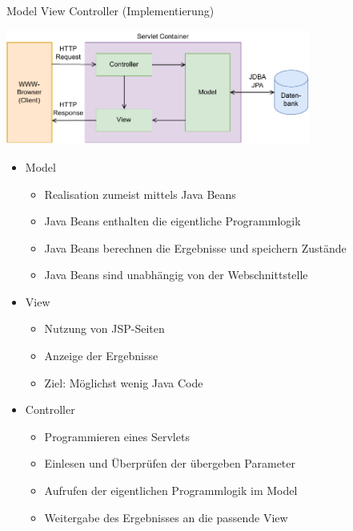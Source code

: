 \begin{defi}{Model View Controller (Implementierung)}
    \begin{center}
        \includegraphics[width=0.75\textwidth]{includes/figures/defi_model_view_controller.pdf}
    \end{center}

    \begin{itemize}
        \item Model
              \begin{itemize}
                  \item Realisation zumeist mittels Java Beans
                  \item Java Beans enthalten die eigentliche Programmlogik
                  \item Java Beans berechnen die Ergebnisse und speichern Zustände
                  \item Java Beans sind unabhängig von der Webschnittstelle
              \end{itemize}
        \item View
              \begin{itemize}
                  \item Nutzung von JSP-Seiten
                  \item Anzeige der Ergebnisse
                  \item Ziel: Möglichst wenig Java Code
              \end{itemize}
        \item Controller
              \begin{itemize}
                  \item Programmieren eines Servlets
                  \item Einlesen und Überprüfen der übergeben Parameter
                  \item Aufrufen der eigentlichen Programmlogik im Model
                  \item Weitergabe des Ergebnisses an die passende View
              \end{itemize}
    \end{itemize}
\end{defi}

